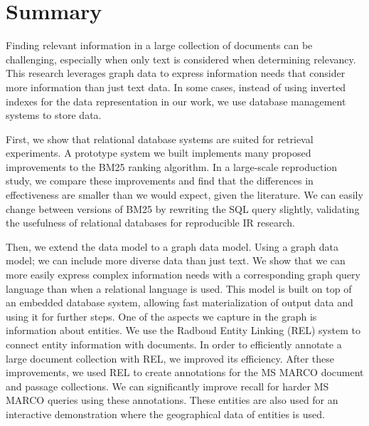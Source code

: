 \chapter*{Summary}

Finding relevant information in a large collection of documents can be challenging, especially when only text is considered when determining relevancy. This research leverages graph data to express information needs that consider more information than just text data. In some cases, instead of using inverted indexes for the data representation in our work, we use database management systems to store data.

First, we show that relational database systems are suited for retrieval experiments. A prototype system we built implements many proposed improvements to the BM25 ranking algorithm. In a large-scale reproduction study, we compare these improvements and find that the differences in effectiveness are smaller than we would expect, given the literature. We can easily change between versions of BM25 by rewriting the SQL query slightly, validating the usefulness of relational databases for reproducible IR research. 

Then, we extend the data model to a graph data model. Using a graph data model; we can include more diverse data than just text. We show that we can more easily express complex information needs with a corresponding graph query language than when a relational language is used. This model is built on top of an embedded database system, allowing fast materialization of output data and using it for further steps.
One of the aspects we capture in the graph is information about entities. We use the Radboud Entity Linking (REL) system to connect entity information with documents. In order to efficiently annotate a large document collection with REL, we improved its efficiency. After these improvements, we used REL to create annotations for the MS MARCO document and passage collections. We can significantly improve recall for harder MS MARCO queries using these annotations. These entities are also used for an interactive demonstration where the geographical data of entities is used.


